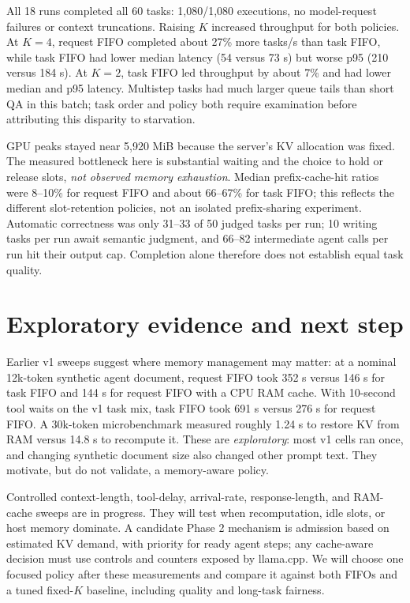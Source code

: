 \documentclass[10pt,letterpaper]{article}
\begin{document}
All 18 runs completed all 60 tasks: 1,080/1,080 executions, no model-request
failures or context truncations. Raising $K$ increased throughput for both
policies. At $K=4$, request FIFO completed about 27\% more tasks/s than task
FIFO, while task FIFO had lower median latency (54 versus 73 s) but worse p95
(210 versus 184 s). At $K=2$, task FIFO led throughput by about 7\% and had
lower median and p95 latency. Multistep tasks had much larger queue tails than
short QA in this batch; task order and policy both require examination before
attributing this disparity to starvation.

GPU peaks stayed near 5,920 MiB because the server's KV allocation was fixed.
The measured bottleneck here is substantial waiting and the choice to hold or
release slots, \emph{not observed memory exhaustion}. Median prefix-cache-hit
ratios were 8--10\% for request FIFO and about 66--67\% for task FIFO; this
reflects the different slot-retention policies, not an isolated prefix-sharing
experiment. Automatic correctness was only 31--33 of 50 judged tasks per run;
10 writing tasks per run await semantic judgment, and 66--82 intermediate
agent calls per run hit their output cap. Completion alone therefore does not
establish equal task quality.

\section{Exploratory evidence and next step}
Earlier v1 sweeps suggest where memory management may matter: at a nominal
12k-token synthetic agent document, request FIFO took 352 s versus 146 s for
task FIFO and 144 s for request FIFO with a CPU RAM cache. With 10-second
tool waits on the v1 task mix, task FIFO took 691 s versus 276 s for request
FIFO. A 30k-token microbenchmark measured roughly 1.24 s to restore KV from
RAM versus 14.8 s to recompute it. These are \emph{exploratory}: most v1 cells
ran once, and changing synthetic document size also changed other prompt text.
They motivate, but do not validate, a memory-aware policy.

Controlled context-length, tool-delay, arrival-rate, response-length, and
RAM-cache sweeps are in progress. They will test when recomputation, idle
slots, or host memory dominate. A candidate Phase 2 mechanism is admission
based on estimated KV demand, with priority for ready agent steps; any
cache-aware decision must use controls and counters exposed by llama.cpp.
We will choose one focused policy after these measurements and compare it
against both FIFOs and a tuned fixed-$K$ baseline, including quality and
long-task fairness.
\end{document}
